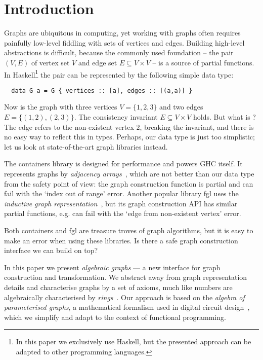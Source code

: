 \vspace{-1mm}
\section{Introduction}\label{sec-intro}

Graphs are ubiquitous in computing, yet working with graphs often requires
painfully low-level fiddling with sets of vertices and edges. Building high-level
abstractions is difficult, because the commonly used foundation -- the pair $(V, E)$
of vertex set $V$ and edge set $E \subseteq V \times V$ -- is a source of partial
functions. In Haskell\footnote{In this paper we exclusively use Haskell, but the
presented approach can be adapted to other programming languages.} the pair can
be represented by the following simple data type:

\begin{verbatim}
  data G a = G { vertices :: [a], edges :: [(a,a)] }
\end{verbatim}

\noindent
Now  is the graph with three vertices $V = \{1,2,3\}$ and
two edges $E = \{(1,2), (2,3)\}$. The consistency invariant $E \subseteq V \times V$ holds.
But what is ? The edge refers to the non-existent vertex $2$, breaking the
invariant, and there is no easy way to reflect this in types. Perhaps, our data type is just
too simplistic; let us look at state-of-the-art graph libraries instead.

The \textsf{containers} library is designed for performance and powers GHC itself. It
represents graphs by \emph{adjacency arrays}~\cite{1995_king_graphs}, which are not
better than our data type from the safety point of view: the  graph construction
function is partial and can fail with the \textsf{`index out of range'} error.
Another popular library \textsf{fgl} uses the \emph{inductive graph
representation}~\cite{2001_erwig_inductive}, but its graph construction API has similar
partial functions, e.g.  can fail with the \textsf{`edge from non-existent
vertex'} error.

Both \textsf{containers} and \textsf{fgl} are treasure troves of graph algorithms,
but it is easy to make an error when using these libraries. Is there a safe graph
construction interface we can build on top?

In this paper we present \emph{algebraic graphs} --- a new interface
for graph construction and transformation. We abstract away from graph representation
details and characterise graphs by a set of axioms, much like numbers are algebraically
characterised by \emph{rings}~\cite{1999_maclane_algebra}. Our approach is based on
the \emph{algebra of parameterised graphs}, a mathematical formalism used in digital
circuit design~\cite{2014_algebra_mokhov}, which we simplify and adapt to the context
of functional programming.

